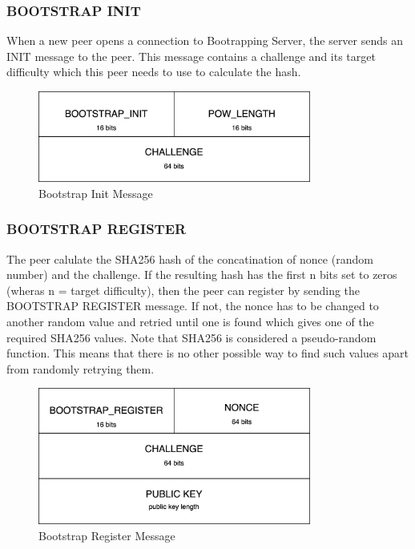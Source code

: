 \subsubsection{BOOTSTRAP INIT}

When a new peer opens a connection to Bootrapping Server, the server sends an INIT message to the peer. This message contains a challenge and its target difficulty which this peer needs to use to calculate the hash.

\begin{figure}[H]
    \centering
    \includegraphics[width=0.8\textwidth]{pics/bootstrap.init.png}
    \caption{Bootstrap Init Message}
\end{figure}

\subsubsection{BOOTSTRAP REGISTER}

The peer calulate the SHA256 hash of the concatination of nonce (random number) and the challenge. If the resulting hash has the first n bits set to zeros (wheras n = target difficulty), then the peer can register by sending the BOOTSTRAP REGISTER message. If not, the nonce has to be changed to another random value and retried until one is found which gives one of the required SHA256 values. Note that SHA256 is considered a pseudo-random function. This means that there is no other possible way to find such values apart from randomly retrying them.

\begin{figure}[H]
    \centering
    \includegraphics[width=0.8\textwidth]{pics/bootstrap.register.png}
    \caption{Bootstrap Register Message}
\end{figure}

